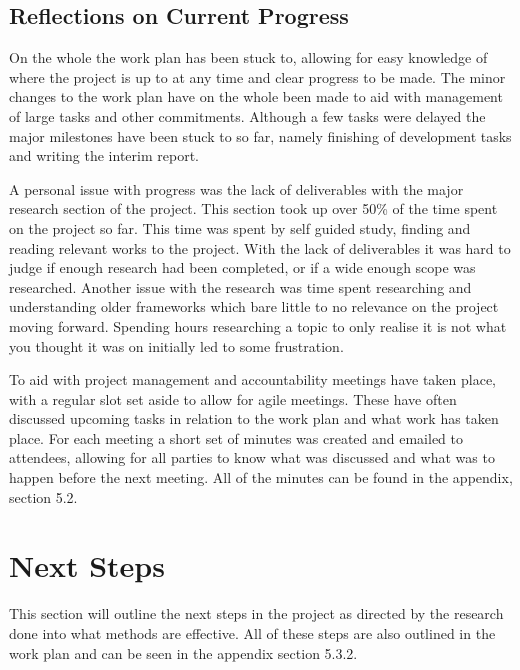 \documentclass[a4paper]{article}
\begin{document}
\subsection{Reflections on Current Progress}
On the whole the work plan has been stuck to, allowing for easy knowledge of where the project is up to at any time and clear progress to be made.
The minor changes to the work plan have on the whole been made to aid with management of large tasks and other commitments.
Although a few tasks were delayed the major milestones have been stuck to so far, namely finishing of development tasks and writing the interim report.
\par
A personal issue with progress was the lack of deliverables with the major research section of the project.
This section took up over 50\% of the time spent on the project so far.
This time was spent by self guided study, finding and reading relevant works to the project.
With the lack of deliverables it was hard to judge if enough research had been completed, or if a wide enough scope was researched.
Another issue with the research was time spent researching and understanding older frameworks which bare little to no relevance on the project moving forward.
Spending hours researching a topic to only realise it is not what you thought it was on initially led to some frustration.
\par
To aid with project management and accountability meetings have taken place, with a regular slot set aside to allow for agile meetings.
These have often discussed upcoming tasks in relation to the work plan and what work has taken place.
For each meeting a short set of minutes was created and emailed to attendees, allowing for all parties to know what was discussed and what was to happen before the next meeting.
All of the minutes can be found in the appendix, section 5.2.

\pagebreak
\section{Next Steps}
This section will outline the next steps in the project as directed by the research done into what methods are effective.
All of these steps are also outlined in the work plan and can be seen in the appendix section 5.3.2.
\end{document}
